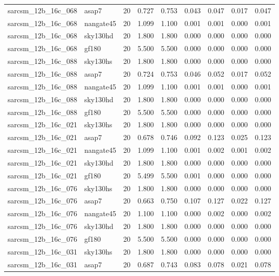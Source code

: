 \begin{tabular}{llrrrrrrr}
sarcsm\_12b\_16c\_068 & asap7 & 20 & 0.727 & 0.753 & 0.043 & 0.047 & 0.017 & 0.047 \\
sarcsm\_12b\_16c\_068 & nangate45 & 20 & 1.099 & 1.100 & 0.001 & 0.001 & 0.000 & 0.001 \\
sarcsm\_12b\_16c\_068 & sky130hd & 20 & 1.800 & 1.800 & 0.000 & 0.000 & 0.000 & 0.000 \\
sarcsm\_12b\_16c\_068 & gf180 & 20 & 5.500 & 5.500 & 0.000 & 0.000 & 0.000 & 0.000 \\
sarcsm\_12b\_16c\_088 & sky130hs & 20 & 1.800 & 1.800 & 0.000 & 0.000 & 0.000 & 0.000 \\
sarcsm\_12b\_16c\_088 & asap7 & 20 & 0.724 & 0.753 & 0.046 & 0.052 & 0.017 & 0.052 \\
sarcsm\_12b\_16c\_088 & nangate45 & 20 & 1.099 & 1.100 & 0.001 & 0.001 & 0.000 & 0.001 \\
sarcsm\_12b\_16c\_088 & sky130hd & 20 & 1.800 & 1.800 & 0.000 & 0.000 & 0.000 & 0.000 \\
sarcsm\_12b\_16c\_088 & gf180 & 20 & 5.500 & 5.500 & 0.000 & 0.000 & 0.000 & 0.000 \\
sarcsm\_12b\_16c\_021 & sky130hs & 20 & 1.800 & 1.800 & 0.000 & 0.000 & 0.000 & 0.000 \\
sarcsm\_12b\_16c\_021 & asap7 & 20 & 0.678 & 0.746 & 0.092 & 0.123 & 0.025 & 0.123 \\
sarcsm\_12b\_16c\_021 & nangate45 & 20 & 1.099 & 1.100 & 0.001 & 0.002 & 0.001 & 0.002 \\
sarcsm\_12b\_16c\_021 & sky130hd & 20 & 1.800 & 1.800 & 0.000 & 0.000 & 0.000 & 0.000 \\
sarcsm\_12b\_16c\_021 & gf180 & 20 & 5.499 & 5.500 & 0.001 & 0.000 & 0.000 & 0.000 \\
sarcsm\_12b\_16c\_076 & sky130hs & 20 & 1.800 & 1.800 & 0.000 & 0.000 & 0.000 & 0.000 \\
sarcsm\_12b\_16c\_076 & asap7 & 20 & 0.663 & 0.750 & 0.107 & 0.127 & 0.022 & 0.127 \\
sarcsm\_12b\_16c\_076 & nangate45 & 20 & 1.100 & 1.100 & 0.000 & 0.002 & 0.000 & 0.002 \\
sarcsm\_12b\_16c\_076 & sky130hd & 20 & 1.800 & 1.800 & 0.000 & 0.000 & 0.000 & 0.000 \\
sarcsm\_12b\_16c\_076 & gf180 & 20 & 5.500 & 5.500 & 0.000 & 0.000 & 0.000 & 0.000 \\
sarcsm\_12b\_16c\_031 & sky130hs & 20 & 1.800 & 1.800 & 0.000 & 0.000 & 0.000 & 0.000 \\
sarcsm\_12b\_16c\_031 & asap7 & 20 & 0.687 & 0.743 & 0.083 & 0.078 & 0.021 & 0.078 \\

\end{tabular}
